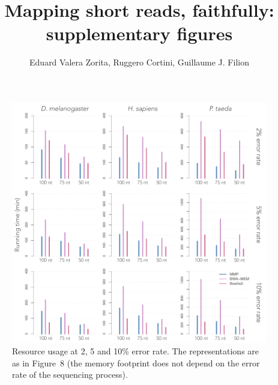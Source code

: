 \documentclass{article}
\title{Mapping short reads, faithfully: supplementary figures}
\author{%
Eduard Valera Zorita,
Ruggero Cortini,
Guillaume J. Filion}
\begin{document}
\begin{titlingpage}
\maketitle
\end{titlingpage}

\begin{figure}
\begin{center}
\includegraphics[scale=.53]{timem_supp.pdf}
\end{center}
\caption{Resource usage at 2, 5 and 10\% error rate. The representations
are as in Figure~8 (the memory footprint does not depend on the error rate
of the sequencing process).}
\end{figure}
\end{document}
